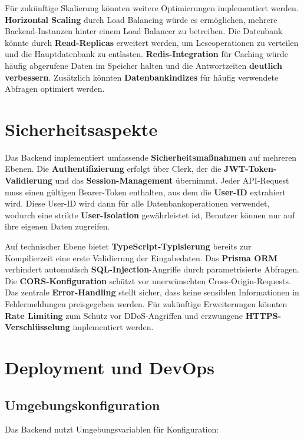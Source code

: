 Für zukünftige Skalierung könnten weitere Optimierungen implementiert werden. \textbf{Horizontal Scaling} durch Load Balancing würde es ermöglichen, mehrere Backend-Instanzen hinter einem Load Balancer zu betreiben. Die Datenbank könnte durch \textbf{Read-Replicas} erweitert werden, um Leseoperationen zu verteilen und die Hauptdatenbank zu entlasten. \textbf{Redis-Integration} für Caching würde häufig abgerufene Daten im Speicher halten und die Antwortzeiten \textbf{deutlich verbessern}. Zusätzlich könnten \textbf{Datenbankindizes} für häufig verwendete Abfragen optimiert werden.

\section{Sicherheitsaspekte}

Das Backend implementiert umfassende \textbf{Sicherheitsmaßnahmen} auf mehreren Ebenen. Die \textbf{Authentifizierung} erfolgt über Clerk, der die \textbf{JWT-Token-Validierung} und das \textbf{Session-Management} übernimmt. Jeder API-Request muss einen gültigen Bearer-Token enthalten, aus dem die \textbf{User-ID} extrahiert wird. Diese User-ID wird dann für alle Datenbankoperationen verwendet, wodurch eine strikte \textbf{User-Isolation} gewährleistet ist, Benutzer können nur auf ihre eigenen Daten zugreifen.

Auf technischer Ebene bietet \textbf{TypeScript-Typisierung} bereits zur Kompilierzeit eine erste Validierung der Eingabedaten. Das \textbf{Prisma ORM} verhindert automatisch \textbf{SQL-Injection}-Angriffe durch parametrisierte Abfragen. Die \textbf{CORS-Konfiguration} schützt vor unerwünschten Cross-Origin-Requests. Das zentrale \textbf{Error-Handling} stellt sicher, dass keine sensiblen Informationen in Fehlermeldungen preisgegeben werden. Für zukünftige Erweiterungen könnten \textbf{Rate Limiting} zum Schutz vor DDoS-Angriffen und erzwungene \textbf{HTTPS-Verschlüsselung} implementiert werden.

\section{Deployment und DevOps}

\subsection{Umgebungskonfiguration}

Das Backend nutzt Umgebungsvariablen für Konfiguration:

